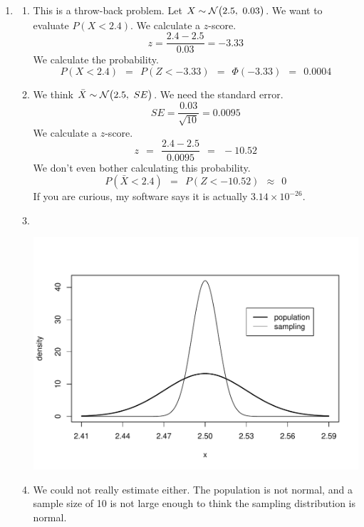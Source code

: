\documentclass[12pt,letterpaper]{article}
\begin{document}
\begin{enumerate}
\item \begin{enumerate}
\item This is a throw-back problem. Let $X\sim\mathcal{N}\big(2.5,~0.03\big)$. We want to evaluate $P(X<2.4)$. We calculate a $z$-score.
$$z = \frac{2.4-2.5}{0.03} = -3.33$$
We calculate the probability.
$$P(X<2.4) ~~=~~ P(Z<-3.33) ~~=~~ \Phi(-3.33) ~~=~~ 0.0004 $$
\item We think $\bar{X}\sim \mathcal{N}\big(2.5,~SE\big)$. We need the standard error.
$$SE = \frac{0.03}{\sqrt{10}} = 0.0095$$
We calculate a $z$-score.
$$z ~~=~~ \frac{2.4-2.5}{0.0095} ~~=~~ -10.52 $$
We don't even bother calculating this probability.
$$P(\bar{X}<2.4) ~~=~~ P(Z<-10.52) ~~\approx~~ 0$$
If you are curious, my software says it is actually $3.14\times 10^{-26}$.
\item {~}\\\vspace{-100pt}
\begin{center}
\includegraphics[scale=0.9]{code/Ex4p39_overlay.pdf}
\end{center}
\item We could not really estimate either. The population is not normal, and a sample size of 10 is not large enough to think the sampling distribution is normal.
\end{enumerate}


\newpage



\end{enumerate}
\end{document}
